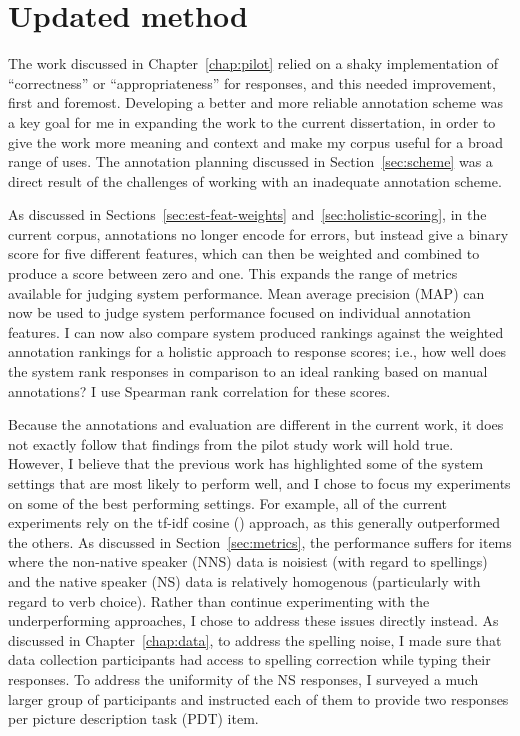 \section{Updated method}
\label{sec:current-method}
The work discussed in Chapter~\ref{chap:pilot} relied on a shaky implementation of ``correctness'' or ``appropriateness'' for responses, and this needed improvement, first and foremost. Developing a better and more reliable annotation scheme was a key goal for me in expanding the work to the current dissertation, in order to give the work more meaning and context and make my corpus useful for a broad range of uses. The annotation planning discussed in Section~\ref{sec:scheme} was a direct result of the challenges of working with an inadequate annotation scheme. 

As discussed in Sections~\ref{sec:est-feat-weights} and~\ref{sec:holistic-scoring}, in the current corpus, annotations no longer encode for errors, but instead give a binary score for five different features, which can then be weighted and combined to produce a score between zero and one. This expands the range of metrics available for judging system performance. Mean average precision (MAP) can now be used to judge system performance focused on individual annotation features. I can now also compare system produced rankings against the weighted annotation rankings for a holistic approach to response scores; i.e., how well does the system rank responses in comparison to an ideal ranking based on manual annotations? I use Spearman rank correlation for these scores.

Because the annotations and evaluation are different in the current work, it does not exactly follow that findings from the pilot study work will hold true. However, I believe that the previous work has highlighted some of the system settings that are most likely to perform well, and I chose to focus my experiments on some of the best performing settings. For example, all of the current experiments rely on the tf-idf cosine () approach, as this generally outperformed the others. As discussed in Section~\ref{sec:metrics}, the  performance suffers for items where the non-native speaker (NNS) data is noisiest (with regard to spellings) and the native speaker (NS) data is relatively homogenous (particularly with regard to verb choice). Rather than continue experimenting with the underperforming approaches, I chose to address these issues directly instead. As discussed in Chapter~\ref{chap:data}, to address the spelling noise, I made sure that data collection participants had access to spelling correction while typing their responses. To address the uniformity of the NS responses, I surveyed a much larger group of participants and instructed each of them to provide two responses per picture description task (PDT) item.

